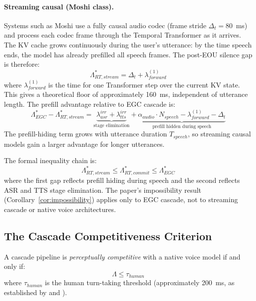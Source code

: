 \paragraph{Streaming causal (Moshi class).}
Systems such as Moshi \citep{defossez2024moshi} use a fully causal audio codec
(frame stride $\Delta_t = 80$~ms) and process each codec frame through the Temporal Transformer
as it arrives.
The KV cache grows continuously during the user's utterance:
by the time speech ends, the model has already prefilled all speech frames.
The post-EOU silence gap is therefore:
\begin{equation}
  \Lambda^*_{RT,stream} = \Delta_t + \lambda_{forward}^{(1)}
\end{equation}
where $\lambda_{forward}^{(1)}$ is the time for one Transformer step over the current KV state.
This gives a theoretical floor of approximately 160~ms, independent of utterance length.
The prefill advantage relative to EGC cascade is:
\begin{equation}
  \Lambda^*_{EGC} - \Lambda^*_{RT,stream}
    = \underbrace{\lambda_{asr}^{irr} + \lambda_{tts}^{irr}}_{\text{stage elimination}}
    + \underbrace{\alpha_{audio} \cdot N_{speech} - \lambda_{forward}^{(1)} - \Delta_t}_{\text{prefill hidden during speech}}
\end{equation}
The prefill-hiding term grows with utterance duration $T_{speech}$,
so streaming causal models gain a larger advantage for longer utterances.

The formal inequality chain is:
\begin{equation}
  \Lambda^*_{RT,stream} \leq \Lambda^*_{RT,commit} \leq \Lambda^*_{EGC}
\end{equation}
where the first gap reflects prefill hiding during speech and the second reflects
ASR and TTS stage elimination.
The paper's impossibility result (Corollary~\ref{cor:impossibility}) applies only to EGC cascade,
not to streaming cascade or native voice architectures.

\subsection{The Cascade Competitiveness Criterion}

\begin{definition}
\label{def:ccc}
A cascade pipeline is \emph{perceptually competitive} with a native voice model if and only if:
\begin{equation}
  \Lambda \leq \tau_{human}
\end{equation}
where $\tau_{human}$ is the human turn-taking threshold (approximately 200~ms,
as established by \citet{levinson2015timing} and \citet{stivers2009universals}).
\end{definition}

